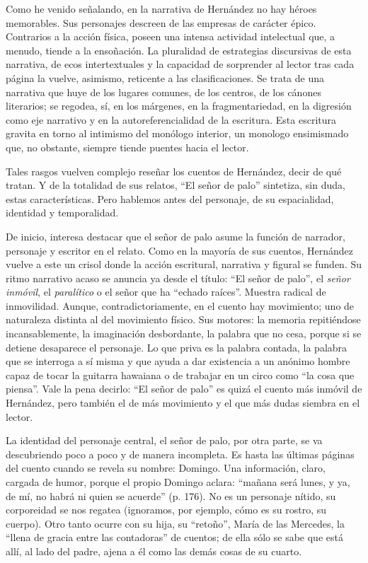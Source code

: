 \documentclass[14pt,twoside,final]{extbook} %
\begin{document}
Como he venido señalando, en la narrativa de Hernández no hay héroes memorables. Sus personajes descreen de las empresas de carácter épico. Contrarios a la acción física, poseen una intensa actividad intelectual que, a menudo, tiende a la ensoñación. La pluralidad de estrategias discursivas de esta narrativa, de ecos intertextuales y la capacidad de sorprender al lector tras cada página la
vuelve, asimismo, reticente a las clasificaciones. Se trata de una narrativa que huye de los lugares comunes, de los centros, de los cánones literarios; se regodea, sí, en los márgenes, en la fragmentariedad, en la digresión como eje narrativo y en la autoreferencialidad de la escritura. Esta escritura gravita en torno al intimismo del monólogo interior, un monologo ensimismado que, no obstante, siempre tiende puentes hacia el lector.

Tales rasgos vuelven complejo reseñar los cuentos de Hernández, decir de qué tratan. Y de la totalidad de sus relatos, ``El señor de palo'' sintetiza, sin duda, estas características. Pero hablemos antes del personaje, de su espacialidad, identidad y temporalidad.

De inicio, interesa destacar que el señor de palo asume la función de narrador, personaje y escritor en el relato. Como en la mayoría de sus cuentos, Hernández vuelve a este un crisol donde la acción escritural, narrativa y figural se funden. Su ritmo narrativo acaso se anuncia ya desde el título: ``El señor de palo'', el \emph{señor inmóvil}, el \emph{paralítico} o el señor que ha ``echado raíces''. Muestra radical de inmovilidad. Aunque, contradictoriamente, en el cuento hay movimiento; uno de naturaleza distinta al del movimiento físico. Sus motores: la memoria repitiéndose incansablemente, la imaginación desbordante, la palabra que no cesa, porque si se detiene desaparece el personaje. Lo que priva es la palabra contada, la palabra que se interroga a sí misma y que ayuda a dar existencia a un anónimo hombre capaz de tocar la guitarra hawaiana o de trabajar en un circo como ``la cosa que piensa''. Vale la pena decirlo: ``El señor de palo'' es quizá el cuento más inmóvil de Hernández, pero también el de más movimiento y el que más dudas siembra en el lector.

La identidad del personaje central, el señor de palo, por otra parte, se va descubriendo poco a poco y de manera incompleta. Es hasta las últimas páginas del cuento cuando se revela su nombre: Domingo. Una información, claro, cargada de humor, porque el propio Domingo aclara: ``mañana será lunes, y ya, de mí, no habrá ni quien se acuerde'' (p. 176). No es un personaje nítido, su corporeidad se nos regatea (ignoramos, por ejemplo, cómo es su rostro, su cuerpo). Otro tanto ocurre con su hija, su ``retoño'', María de las Mercedes, la ``llena de gracia entre las contadoras'' de cuentos; de ella sólo se sabe que está allí, al lado del padre, ajena a él como las demás cosas de su cuarto.
\end{document}
